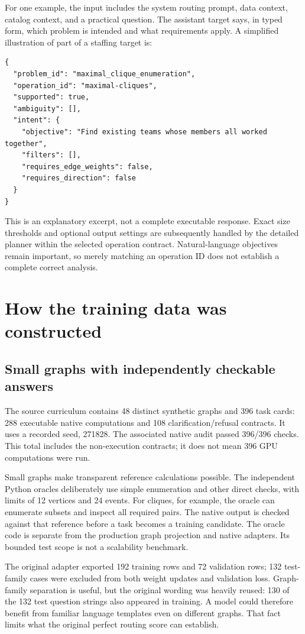 \documentclass[11pt,a4paper]{article}
\begin{document}
For one example, the input includes the system routing prompt, data context,
catalog context, and a practical question. The assistant target says, in typed
form, which problem is intended and what requirements apply. A simplified
illustration of part of a staffing target is:

\begin{lstlisting}
{
  "problem_id": "maximal_clique_enumeration",
  "operation_id": "maximal-cliques",
  "supported": true,
  "ambiguity": [],
  "intent": {
    "objective": "Find existing teams whose members all worked together",
    "filters": [],
    "requires_edge_weights": false,
    "requires_direction": false
  }
}
\end{lstlisting}
This is an explanatory excerpt, not a complete executable response. Exact size
thresholds and optional output settings are subsequently handled by the detailed
planner within the selected operation contract. Natural-language objectives
remain important, so merely matching an operation ID does not establish a
complete correct analysis.

\section{How the training data was constructed}

\subsection{Small graphs with independently checkable answers}

The source curriculum contains 48 distinct synthetic graphs and 396 task cards:
288 executable native computations and 108 clarification/refusal contracts.
It uses a recorded seed, 271828. The associated native audit passed 396/396
checks. This total includes the non-execution contracts; it does not mean 396
GPU computations were run.

Small graphs make transparent reference calculations possible. The independent
Python oracles deliberately use simple enumeration and other direct checks,
with limits of 12 vertices and 24 events. For cliques, for example, the oracle
can enumerate subsets and inspect all required pairs. The native output is
checked against that reference before a task becomes a training candidate.
The oracle code is separate from the production graph projection and native
adapters. Its bounded test scope is not a scalability benchmark.

The original adapter exported 192 training rows and 72 validation rows; 132
test-family cases were excluded from both weight updates and validation loss.
Graph-family separation is useful, but the original wording was heavily reused:
130 of the 132 test question strings also appeared in training. A model could
therefore benefit from familiar language templates even on different graphs.
That fact limits what the original perfect routing score can establish.
\end{document}

